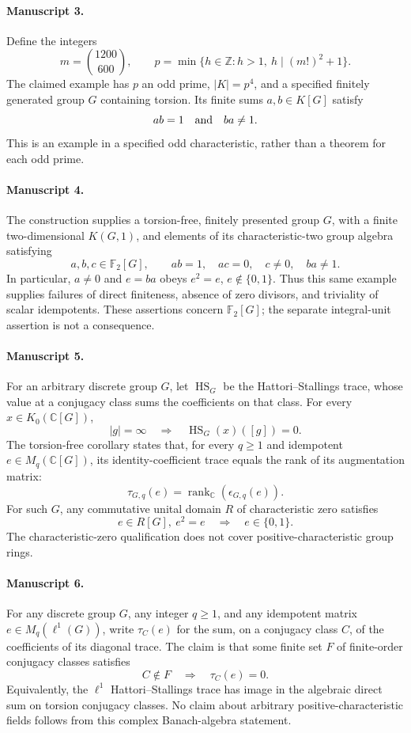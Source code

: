 \documentclass[11pt]{article}
\begin{document}
\paragraph{Manuscript 3.}
Define the integers
\[
 m=\binom{1200}{600},\qquad
 p=\min\{h\in\mathbb Z:h>1,\ h\mid(m!)^2+1\}.
\]
The claimed example has \(p\) an odd prime, \(|K|=p^4\), and a specified finitely generated group \(G\) containing torsion. Its finite sums \(a,b\in K[G]\) satisfy
\[
 ab=1\quad\hbox{and}\quad ba\ne1.
\]
This is an example in a specified odd characteristic, rather than a theorem for each odd prime.

\paragraph{Manuscript 4.}
The construction supplies a torsion-free, finitely presented group \(G\), with a finite two-dimensional \(K(G,1)\), and elements of its characteristic-two group algebra satisfying
\[
 a,b,c\in\mathbb F_2[G],\qquad ab=1,\quad ac=0,\quad c\ne0,\quad ba\ne1.
\]
In particular, \(a\ne0\) and \(e=ba\) obeys \(e^2=e\), \(e\notin\{0,1\}\). Thus this same example supplies failures of direct finiteness, absence of zero divisors, and triviality of scalar idempotents. These assertions concern \(\mathbb F_2[G]\); the separate integral-unit assertion is not a consequence.

\paragraph{Manuscript 5.}
For an arbitrary discrete group \(G\), let \(\operatorname{HS}_G\) be the Hattori--Stallings trace, whose value at a conjugacy class sums the coefficients on that class. For every \(x\in K_0(\mathbb C[G])\),
\[
 |g|=\infty\quad\Longrightarrow\quad\operatorname{HS}_G(x)([g])=0.
\]
The torsion-free corollary states that, for every \(q\ge1\) and idempotent \(e\in M_q(\mathbb C[G])\), its identity-coefficient trace equals the rank of its augmentation matrix:
\[
 \tau_{G,q}(e)=\operatorname{rank}_{\mathbb C}(\epsilon_{G,q}(e)).
\]
For such \(G\), any commutative unital domain \(R\) of characteristic zero satisfies
\[
 e\in R[G],\ e^2=e\quad\Longrightarrow\quad e\in\{0,1\}.
\]
The characteristic-zero qualification does not cover positive-characteristic group rings.

\paragraph{Manuscript 6.}
For any discrete group \(G\), any integer \(q\ge1\), and any idempotent matrix \(e\in M_q(\ell^1(G))\), write \(\tau_C(e)\) for the sum, on a conjugacy class \(C\), of the coefficients of its diagonal trace. The claim is that some finite set \(F\) of finite-order conjugacy classes satisfies
\[
 C\notin F\quad\Longrightarrow\quad\tau_C(e)=0.
\]
Equivalently, the \(\ell^1\) Hattori--Stallings trace has image in the algebraic direct sum on torsion conjugacy classes. No claim about arbitrary positive-characteristic fields follows from this complex Banach-algebra statement.
\end{document}
